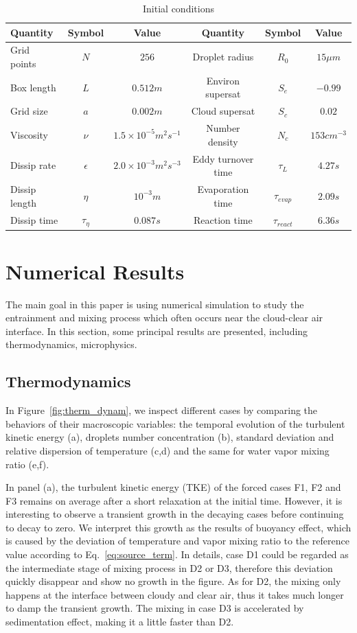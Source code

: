 \documentclass[draft,jgrga]{AGUTeX}
\newcommand{\Eq}[1]{Eq.~\eqref{#1}} \newcommand{\Fig}[1]{Figure~\ref{#1}}
\begin{document}
\begin{article}
\begin{table}
\begin{tabular}{l c c c c c}
\hline\hline
Quantity & Symbol & Value & Quantity & Symbol & Value\\
\hline
Grid points & $N$ & $256$ & Droplet radius & $R_{0}$ & $15\mu m$\\
Box length & $L$ & $0.512m$ & Environ supersat & $S_{e}$ & $-0.99$\\
Grid size & $a$ & $0.002m$ & Cloud supersat & $S_{c}$ & $0.02$\\
Viscosity & $\nu$ & $1.5\times10^{-5}m^{2}s^{-1}$ & Number density& $N_{c}$ & $153cm^{-3}$\\
Dissip rate& $\epsilon$ & $2.0\times10^{-3}m^{2}s^{-3}$ & Eddy turnover time & $\tau_{L}$ & $4.27s$\\
Dissip length& $\eta$ & $10^{-3}m$ & Evaporation time & $\tau_{evap}$ & $2.09s$\\
Dissip time& $\tau_{\eta}$ & $0.087s$ & Reaction time & $\tau_{react}$ & $6.36s$\\
\hline
\end{tabular}
\caption{Initial conditions}
\label{tb:parameters}
\end{table}

\section{Numerical Results}
The main goal in this paper is using numerical simulation to study
the entrainment and mixing process which often occurs near the cloud-clear air interface. In this section, some principal results are presented, including thermodynamics, microphysics.

\subsection{Thermodynamics}
In \Fig{fig:therm_dynam}, we inspect different cases by comparing the behaviors of their macroscopic 
variables: the temporal evolution of the turbulent kinetic energy (a), droplets number concentration (b), standard deviation and relative dispersion of temperature (c,d) and the same for water vapor mixing ratio (e,f). 

In panel (a), the turbulent kinetic energy (TKE) of the forced cases F1, F2 and F3 remains on average after a short relaxation at the initial time. However, it is interesting to observe a transient growth in the decaying cases before continuing to decay to zero. We interpret this growth as the results of buoyancy effect, which is caused by the deviation of temperature and vapor mixing ratio to the reference value according to \Eq{eq:source_term}. In details, case D1 could be regarded as the intermediate stage of mixing process in D2 or D3, therefore this deviation quickly disappear and show no growth in the figure. As for D2, the mixing only happens at the interface between cloudy and clear air, thus it takes much longer to damp the transient growth. The mixing in case D3 is accelerated by sedimentation effect, making it a little faster than D2.


\end{article}
\end{document}
